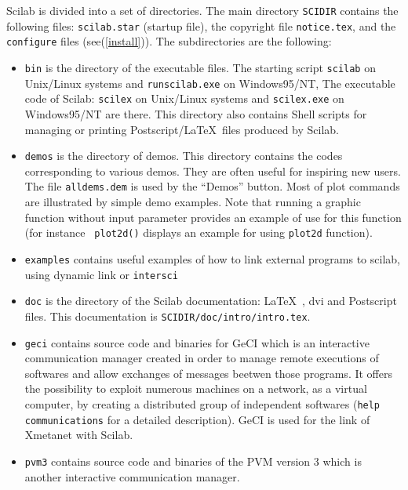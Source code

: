 Scilab is divided into a set of directories. The main directory
\verb!SCIDIR! contains the following files: {\tt scilab.star} (startup file), the
copyright file {\tt notice.tex}, and the \verb!configure! files
(see(\ref{install})).
The subdirectories are the following:
\begin{itemize}

\item{{\tt bin} is the directory of the executable files.
The starting script {\tt scilab} on Unix/Linux systems and {\tt runscilab.exe} on Windows95/NT, The executable code of Scilab: {\tt scilex} on Unix/Linux systems and {\tt scilex.exe} on Windows95/NT are there. 
This directory also contains Shell scripts 
for managing or printing Postscript/\LaTeX\  files produced by Scilab.}

\item{{\tt demos} is the directory of demos. 
This directory contains the codes corresponding
to various demos. They are often useful for inspiring new users.
The file 
{\tt alldems.dem} is used by the  ``Demos'' button. 
Most of plot commands are illustrated by simple demo examples. 
Note that running a graphic function without input parameter
provides an example of use for this function (for instance {\tt
plot2d()} displays an example for using {\tt plot2d}  function). }

\item{{\tt examples} contains useful examples of how to link
external programs to scilab, using dynamic link or {\tt intersci}}

\item{{\tt doc} is the directory of the Scilab documentation: \LaTeX\ , dvi 
and Postscript files. 
This documentation is {\tt SCIDIR/doc/intro/intro.tex}. }

\item{{\tt geci} contains source code and binaries for GeCI which is an 
interactive communication manager created in order to
manage remote executions of softwares and allow exchanges of messages
beetwen those programs. It offers the possibility to exploit numerous
machines on a network, as a virtual computer, by creating a
distributed group of independent softwares 
(\verb!help communications! for a detailed description).
GeCI is used for the link of Xmetanet with Scilab.}

\item{\tt pvm3} contains source code and binaries of the PVM version
3 which is another interactive communication manager. 


\end{itemize}
